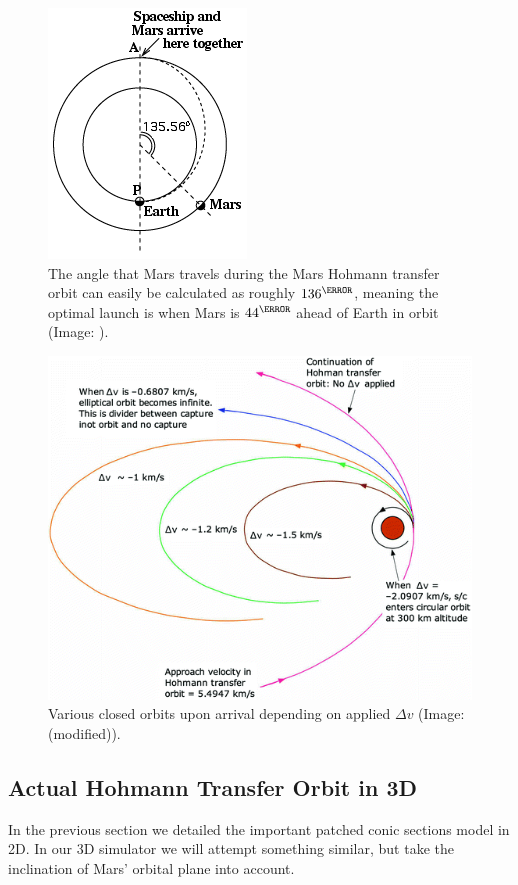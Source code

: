 \begin{figure}[ht]
    \centering
    \includegraphics[width=0.35\linewidth]{fig/Hohmann-angle.png}
    \caption{The angle that Mars travels during the Mars Hohmann transfer orbit can easily be calculated as roughly \(136^\degree\), meaning the optimal launch is when Mars is \(44^\degree\) ahead of Earth in orbit (Image: \cite{Stern}).}
    \label{fig:Hohmann-angle}
\end{figure}

\begin{figure}[ht]
    \centering
    \includegraphics[width=0.85\linewidth]{fig/mars-arrival-orbit.png}
    \caption{Various closed orbits upon arrival depending on applied $\Delta v$ (Image: \cite[p.~137]{Rapp2016} (modified)).}
    \label{fig:mars-arrival-orbit}
\end{figure}

\clearpage

\subsection{Actual Hohmann Transfer Orbit in 3D}
In the previous section we detailed the important patched conic sections model in 2D. In our 3D simulator we will attempt something similar, but take the inclination of Mars' orbital plane into account.

